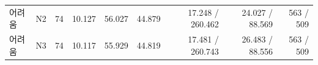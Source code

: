 \begin{table}[t]
\begin{tabularx}{\textwidth}{Ylrrrrrrr}
어려움 & N2 & 74 & 10.127 & 56.027 & 44.879 & 17.248 / 260.462 & 24.027 / 88.569 & 563 / 509 \\
어려움 & N3 & 74 & 10.117 & 55.929 & 44.819 & 17.481 / 260.743 & 26.483 / 88.556 & 563 / 509 \\
\bottomrule
\end{tabularx}
\end{table}
